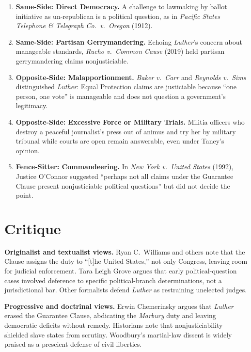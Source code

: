 \documentclass[12pt]{article}
\begin{document}
\begin{enumerate}
\item \textbf{Same-Side: Direct Democracy.} A challenge to lawmaking by ballot initiative as un-republican is a political question, as in \textit{Pacific States Telephone \& Telegraph Co.\ v.\ Oregon} (1912).
\item \textbf{Same-Side: Partisan Gerrymandering.} Echoing \textit{Luther}'s concern about manageable standards, \textit{Rucho v.\ Common Cause} (2019) held partisan gerrymandering claims nonjusticiable.
\item \textbf{Opposite-Side: Malapportionment.} \textit{Baker v.\ Carr} and \textit{Reynolds v.\ Sims} distinguished \textit{Luther}: Equal Protection claims are justiciable because ``one person, one vote'' is manageable and does not question a government's legitimacy.
\item \textbf{Opposite-Side: Excessive Force or Military Trials.} Militia officers who destroy a peaceful journalist's press out of animus and try her by military tribunal while courts are open remain answerable, even under Taney's opinion.
\item \textbf{Fence-Sitter: Commandeering.} In \textit{New York v.\ United States} (1992), Justice O'Connor suggested ``perhaps not all claims under the Guarantee Clause present nonjusticiable political questions'' but did not decide the point.
\end{enumerate}

\section{Critique}

\textbf{Originalist and textualist views.} Ryan C.\ Williams and others note that the Clause assigns the duty to ``[t]he United States,'' not only Congress, leaving room for judicial enforcement. Tara Leigh Grove argues that early political-question cases involved deference to specific political-branch determinations, not a jurisdictional bar. Other formalists defend \textit{Luther} as restraining unelected judges.

\textbf{Progressive and doctrinal views.} Erwin Chemerinsky argues that \textit{Luther} erased the Guarantee Clause, abdicating the \textit{Marbury} duty and leaving democratic deficits without remedy. Historians note that nonjusticiability shielded slave states from scrutiny. Woodbury's martial-law dissent is widely praised as a prescient defense of civil liberties.
\end{document}
